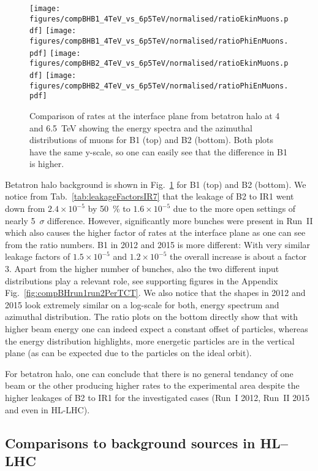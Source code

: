 \begin{figure}
\centering
  \texttt{[image: figures/compBHB1\_4TeV\_vs\_6p5TeV/normalised/ratioEkinMuons.pdf]}
  \texttt{[image: figures/compBHB1\_4TeV\_vs\_6p5TeV/normalised/ratioPhiEnMuons.pdf]}
  \texttt{[image: figures/compBHB2\_4TeV\_vs\_6p5TeV/normalised/ratioEkinMuons.pdf]}
  \texttt{[image: figures/compBHB2\_4TeV\_vs\_6p5TeV/normalised/ratioPhiEnMuons.pdf]}
 \caption{Comparison of rates at the interface plane from betatron halo at 4 and 6.5~TeV showing the energy spectra and the azimuthal distributions of muons for B1 (top) and B2 (bottom). Both plots have the same y-scale, so one can easily see that the difference in B1 is higher.
  \label{fig:compBHrun1run2}}
\end{figure}

Betatron halo background is shown in Fig.~\ref{fig:compBHrun1run2} for B1 (top) and B2 (bottom). We notice from Tab.~\ref{tab:leakageFactorsIR7} that the leakage of B2 to IR1 went down from $2.4 \times 10^{-5}$ by 50~\% to $1.6 \times 10^{-5}$ due to the more open settings of nearly 5~$\sigma$ difference. However, significantly more bunches were present in Run~II which also causes the higher factor of rates at the interface plane as one can see from the ratio numbers. B1 in 2012 and 2015 is more different: With very similar leakage factors of $1.5 \times 10^{-5}$ and $1.2 \times 10^{-5}$ the overall increase is about a factor 3. Apart from the higher number of bunches, also the two different input distributions play a relevant role, see supporting figures in the Appendix Fig.~\ref{fig:compBHrun1run2PerTCT}. We also notice that the shapes in 2012 and 2015 look extremely similar on a log-scale for both, energy spectrum and azimuthal distribution. The ratio plots on the bottom directly show that with higher beam energy one can indeed expect a constant offset of particles, whereas the energy distribution highlights, more energetic particles are in the vertical plane (as can be expected due to the particles on the ideal orbit).

For betatron halo, one can conclude that there is no general tendancy of one beam or the other producing higher rates to the experimental area despite the higher leakages of B2 to IR1 for the investigated cases (Run~I 2012, Run~II 2015 and even in HL-LHC).

\subsection{Comparisons to background sources in HL--LHC}


